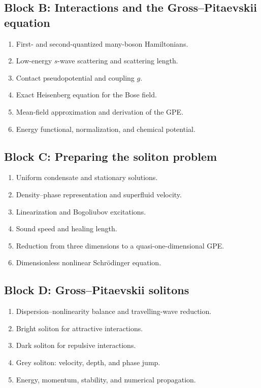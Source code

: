 \subsection{Block B: Interactions and the Gross--Pitaevskii equation}
\begin{enumerate}[label=B\arabic*.]
  \item First- and second-quantized many-boson Hamiltonians.
  \item Low-energy $s$-wave scattering and scattering length.
  \item Contact pseudopotential and coupling $g$.
  \item Exact Heisenberg equation for the Bose field.
  \item Mean-field approximation and derivation of the GPE.
  \item Energy functional, normalization, and chemical potential.
\end{enumerate}

\subsection{Block C: Preparing the soliton problem}
\begin{enumerate}[label=C\arabic*.]
  \item Uniform condensate and stationary solutions.
  \item Density--phase representation and superfluid velocity.
  \item Linearization and Bogoliubov excitations.
  \item Sound speed and healing length.
  \item Reduction from three dimensions to a quasi-one-dimensional GPE.
  \item Dimensionless nonlinear Schr\"odinger equation.
\end{enumerate}

\subsection{Block D: Gross--Pitaevskii solitons}
\begin{enumerate}[label=D\arabic*.]
  \item Dispersion--nonlinearity balance and travelling-wave reduction.
  \item Bright soliton for attractive interactions.
  \item Dark soliton for repulsive interactions.
  \item Grey soliton: velocity, depth, and phase jump.
  \item Energy, momentum, stability, and numerical propagation.
\end{enumerate}

